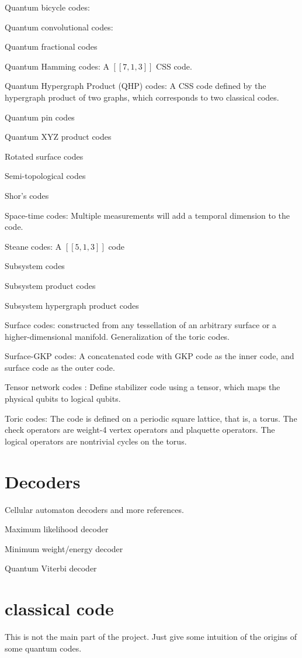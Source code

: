 \documentclass[aps,%
pra, twocolumn,%
notitlepage,longbibliography]{revtex4-2}
\begin{document}
Quantum bicycle codes:

Quantum convolutional codes:

Quantum fractional codes \cite{vijay2016fracton,dua2019sorting}

Quantum Hamming codes:
A $[[7,1,3]]$ CSS code.


Quantum Hypergraph Product (QHP) codes:
A CSS code defined by the hypergraph product of two graphs, which
corresponds to two classical codes.

Quantum pin codes

Quantum XYZ product codes

Rotated surface codes

Semi-topological codes \cite{roffe2020decoding}

Shor's codes

Space-time codes: Multiple measurements will add a temporal dimension
to the code.

Steane codes: A $[[5,1,3]]$ code

Subsystem codes

Subsystem product codes

Subsystem hypergraph product codes

Surface codes: constructed from any tessellation of an arbitrary
surface or a higher-dimensional manifold. Generalization of the toric codes.

Surface-GKP codes: A concatenated code with GKP code as the inner
code, and surface code as the outer code.

Tensor network codes \cite{farrelly2020tensor}: Define stabilizer code
using a tensor, which maps the physical qubits to logical qubits.



Toric codes: The code is defined on a periodic square lattice, that
is, a torus. The check operators are weight-4 vertex operators and
plaquette operators. The logical operators are nontrivial cycles on
the torus.


\section{Decoders}

Cellular automaton decoders \cite{vasmer2020cellular} and more references.


Maximum likelihood decoder

Minimum weight/energy decoder

Quantum Viterbi decoder


\section{classical code}
This is not the main part of the project. Just give some intuition of
the origins of some quantum codes.
\end{document}
